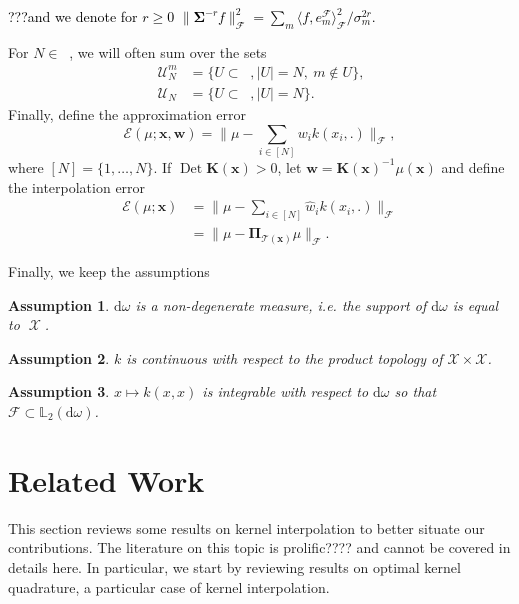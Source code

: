 \documentclass[twoside,11pt]{book}
\newcommand{\rev}[1]{\textcolor{black}{#1}}
\newtheorem{assumption}{Assumption}
\numberwithin{theorem}{chapter}
\numberwithin{definition}{chapter}
\numberwithin{proposition}{chapter}
\numberwithin{corollary}{chapter}
\numberwithin{example}{chapter}
\numberwithin{lemma}{chapter}
\numberwithin{assumption}{chapter}
\numberwithin{equation}{chapter}
\numberwithin{figure}{chapter}
\DeclareMathOperator{\Det}{Det}
\DeclareMathOperator{\Span}{\mathrm{Span}}
\DeclareMathOperator{\F}{\mathcal{F}}
\DeclareMathOperator{\X}{\mathcal{X}}
\DeclareMathOperator{\Ns}{\mathbb{N}^{*}}
\def\UN{\:\mathcal{U}_N}
\def\UNm{\:\mathcal{U}_N^m}
\newcommand{\rb}[1]{\textcolor{magenta}{#1}}
\begin{document}
\rev{ ???and we denote for $r\geq 0$ $\|\bm{\Sigma}^{-r}f\|_{\mathcal{F}}^{2} = \sum_{m} \langle f,e_{m}^{\mathcal{F}} \rangle_{\mathcal{F}}^{2}/\sigma_{m}^{2r}$.}

For $N \in \Ns$, we will often sum over the sets
\begin{align}
	\UNm &=  \{ U \subset \Ns, |U| = N,\: m \notin U \},\\
  \UN &=  \{ U \subset \Ns, |U| = N \}.
\end{align}
Finally, define the approximation error
\begin{equation}\label{CVS_def:E}
	\mathcal{E}(\mu;\bm{x},\bm{w}) = \|\mu - \sum\limits_{i \in [N]} w_{i} k(x_{i},.)\|_{\F},
\end{equation}
where $[N]=\{1,\dots,N\}$. If $\Det \bm{K}(\bm{x}) >0$, let $\hat{\bm{w}} = \bm{K}(\bm{x})^{-1} \mu(\bm{x})$ and define the interpolation error
\begin{align}\label{CVS_def:Ei}
	\mathcal{E}(\mu;\bm{x}) &= \|\mu - \sum\limits_{i \in [N]} \hat{w} _{i} k(x_{i},.)\|_{\F}\\
  & = \|\mu - \bm{\Pi}_{\mathcal{T}(\bm{x})} \mu\|_{\F}.
\end{align}

Finally, we keep the assumptions
\begin{assumption}\label{CVS_hyp:domega_is_nondegenerate}
$\mathrm{d}\omega$ is a \emph{non-degenerate} measure, i.e. the support of $\mathrm{d}\omega$ is equal to $\X$.
\end{assumption}

\begin{assumption}\label{CVS_hyp:k_is_continuous}
$k$ is continuous with respect to the product topology of $\mathcal{X} \times \mathcal{X}$.
\end{assumption}

\begin{assumption}\label{CVS_hyp:integrable_diagonal}
$x \mapsto k(x,x)$ is integrable with respect to $\mathrm{d}\omega$ so that $\mathcal{F} \subset \mathbb{L}_{2}(\mathrm{d}\omega)$.
\end{assumption}



\section{Related Work}\label{CVS_s:relatedWork}
This section reviews some results on kernel interpolation to better situate our contributions. The literature on this topic is prolific???? and cannot be covered in details here. In particular, we start by reviewing results on optimal kernel quadrature, a particular case of kernel interpolation.
\end{document}
